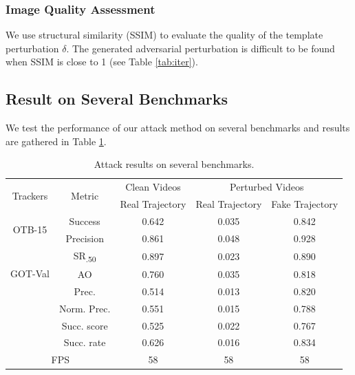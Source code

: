 \documentclass{article}
\begin{document}
\subsubsection{Image Quality Assessment} We use structural similarity (SSIM) to evaluate the quality of the template perturbation $\delta$. The generated adversarial perturbation is difficult to be found when SSIM is close to 1 (see Table \ref{tab:iter}).

\subsection{Result on Several Benchmarks}

We test the performance of our attack method on several benchmarks and results are gathered in Table \ref{tab:benchmark results}.

\begin{table}[hbtp]
\centering
\scriptsize
\tabcolsep=2.0pt
\begin{tabular}{c c | c | c | c}
\toprule
\multirow{2}{*}[-2pt]{Trackers} & \multirow{2}{*}[-2pt]{Metric} & Clean Videos    & \multicolumn{2}{c}{Perturbed Videos}  \\
\cmidrule{3-5}
                          &                         & Real Trajectory & Real Trajectory & Fake Trajectory     \\ 
\midrule
\multirow{2}{*}{OTB-15} 
& Success   & 0.642 & 0.035 & 0.842\\
& Precision & 0.861 & 0.048 & 0.928\\
\midrule
\multirow{3}{*}{GOT-Val} 
& SR\textsubscript{.50} & 0.897 & 0.023 & 0.890\\
& AO 				   & 0.760 & 0.035 & 0.818 \\
\midrule
\multirow{4}{*}{LaSOT} 
& Prec.       & 0.514 & 0.013 & 0.820\\
& Norm. Prec. & 0.551 & 0.015 & 0.788\\
& Succ. score & 0.525 & 0.022 & 0.767\\
& Succ. rate  & 0.626 & 0.016 & 0.834\\
\midrule
\multicolumn{2}{c|}{FPS} & 58 & 58 & 58\\
\bottomrule
\end{tabular}
\caption{Attack results on several benchmarks.}
\label{tab:benchmark results}
\end{table}
\end{document}
